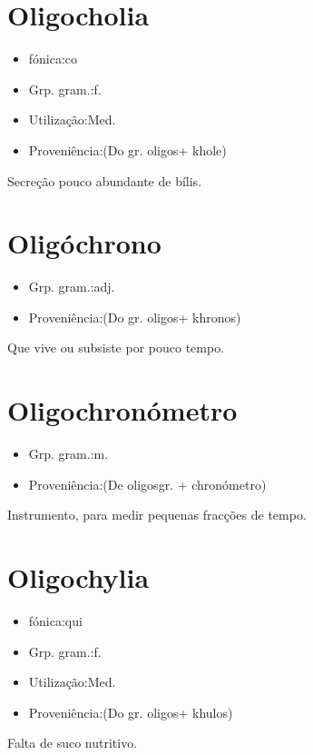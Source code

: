 \section{Oligocholia}
\begin{itemize}
\item {fónica:co}
\end{itemize}
\begin{itemize}
\item {Grp. gram.:f.}
\end{itemize}
\begin{itemize}
\item {Utilização:Med.}
\end{itemize}
\begin{itemize}
\item {Proveniência:(Do gr. \textunderscore oligos\textunderscore  + \textunderscore khole\textunderscore )}
\end{itemize}
Secreção pouco abundante de bílis.
\section{Oligóchrono}
\begin{itemize}
\item {Grp. gram.:adj.}
\end{itemize}
\begin{itemize}
\item {Proveniência:(Do gr. \textunderscore oligos\textunderscore  + \textunderscore khronos\textunderscore )}
\end{itemize}
Que vive ou subsiste por pouco tempo.
\section{Oligochronómetro}
\begin{itemize}
\item {Grp. gram.:m.}
\end{itemize}
\begin{itemize}
\item {Proveniência:(De \textunderscore oligos\textunderscore  gr. + \textunderscore chronómetro\textunderscore )}
\end{itemize}
Instrumento, para medir pequenas fracções de tempo.
\section{Oligochylia}
\begin{itemize}
\item {fónica:qui}
\end{itemize}
\begin{itemize}
\item {Grp. gram.:f.}
\end{itemize}
\begin{itemize}
\item {Utilização:Med.}
\end{itemize}
\begin{itemize}
\item {Proveniência:(Do gr. \textunderscore oligos\textunderscore  + \textunderscore khulos\textunderscore )}
\end{itemize}
Falta de suco nutritivo.
